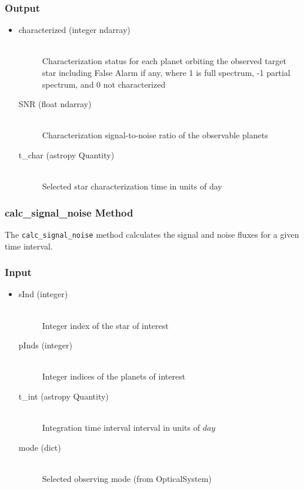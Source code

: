 \documentclass[cleanfoot]{asme2ej}
\begin{document}
\subsubsection*{Output}
\begin{itemize}
\item
\begin{description}
    \item[characterized (integer ndarray)] \hfill \\ Characterization status for each planet orbiting the observed target star including False Alarm if any, where 1 is full spectrum, -1 partial spectrum, and 0 not characterized
    \item[SNR (float ndarray)] \hfill \\ Characterization signal-to-noise ratio of the observable planets
    \item[t\_char (astropy Quantity)] \hfill \\ Selected star characterization time in units of day
\end{description}
\end{itemize}

\subsubsection{calc\_signal\_noise Method} \label{sec:calcsignalnoisetask}
The \verb+calc_signal_noise+ method calculates the signal and noise fluxes for a given time interval. 

\subsubsection*{Input}
\begin{itemize}
\item
\begin{description}
    \item[sInd (integer)] \hfill \\ Integer index of the star of interest
    \item[pInds (integer)] \hfill \\ Integer indices of the planets of interest
    \item[t\_int (astropy Quantity)] \hfill \\ Integration time interval interval in units of $day$
    \item[mode (dict)] \hfill \\ Selected observing mode (from OpticalSystem)
\end{description}
\end{itemize}
\end{document}
